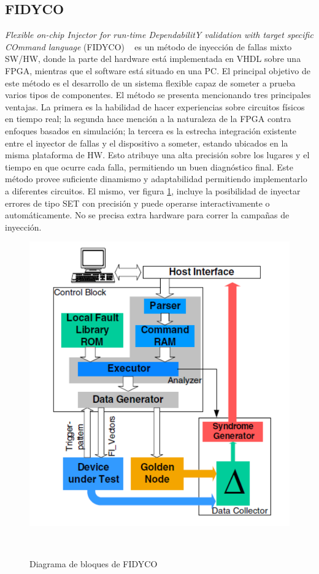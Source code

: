 \documentclass[a4paper,openright,12pt]{report}
\begin{document}
\subsection{FIDYCO}
\textit{Flexible on-chip Injector for run-time DependabilitY validation with target specific COmmand language} (FIDYCO) ~\cite{Rahbaran2004} es un método de inyección de fallas mixto SW/HW, donde la parte del hardware está implementada en VHDL sobre una FPGA, mientras que el software está situado en una PC. El principal objetivo de este método es el desarrollo de un sistema flexible capaz de someter a prueba varios tipos de componentes.
El método se presenta mencionando tres principales ventajas. La primera es la habilidad de hacer experiencias sobre circuitos físicos en tiempo real;  la segunda hace mención a la naturaleza de la FPGA contra enfoques basados en simulación; la tercera es  la estrecha integración existente entre el inyector de fallas y el dispositivo a someter, estando ubicados en la misma plataforma de HW. Esto atribuye una alta precisión  sobre los lugares y  el tiempo en  que ocurre cada falla,  permitiendo un buen  diagnóstico final.
Este método provee  suficiente dinamismo y adaptabilidad permitiendo implementarlo a diferentes circuitos. El mismo, ver figura \ref{FIDYCO},  incluye la posibilidad de inyectar errores de tipo SET con  precisión  y puede operarse interactivamente o automáticamente.
No se precisa  extra hardware  para correr la campañas  de inyección.



\begin{figure}[H]
	\centering
	\includegraphics[width=0.55 \textwidth]{img/FIDYCO.pdf}
	\caption{Diagrama de bloques de FIDYCO}
    ~\cite{Rahbaran2004}
	\label{FIDYCO}
\end{figure}
\end{document}
